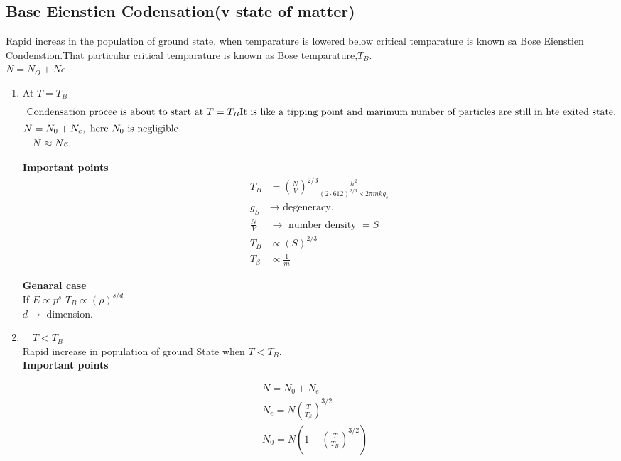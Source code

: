 \subsection{Base Eienstien Codensation(v state of matter)}
Rapid increas in the population of ground state,
when temparature is lowered below critical temparature is known sa Bose Eienstien Condenstion.That particular critical temparature is known as Bose temparature,$T_{B}.$\\
$N=N_{O}+Ne$\\
\begin{enumerate}
	\item At $T=T_{B}$\\
	\begin{align*}
	\intertext{	Condensation procee is about to start at $T=T_{B}$It is like a tipping point and marimum number of particles are still in hte exited state.}
   N&=N_{0}+N_{e},\text{ here $N_{0}$ is negligible}\\
	&N \approx N e.\\
	\end{align*}
	
	
	
\textbf{Important points}\\
	\begin{align*}
	T_{B}&=\left(\frac{N}{V}\right)^{2 / 3} \frac{h^{2}}{(2 \cdot 612)^{2 / 3} \times 2 \pi m k g_{s}}\\
	g_{S} &\rightarrow\text{ degeneracy.}\\
	\frac{N}{V} &\rightarrow\text{ number density $=S$}\\
	T_{B} &\propto(S)^{2 / 3}\\
	T_{\beta} &\propto \frac{1}{m}
	\end{align*}
	
	
	
\textbf{Genaral case}\\
	If $E \propto p^{s}$ $T_{B} \propto(\rho)^{s / d}$\\
	$d \rightarrow$ dimension.
	\item  $\quad T<T_{B}$\\
	Rapid increase in population of ground State when $T<T_{B}$.\\
\textbf{Important points}\\
\end{enumerate}
	\begin{align*}
	&N=N_{0}+N_{e} \\
	&N_{e}=N\left(\frac{T}{T_{\beta}}\right)^{3 / 2} \\
	&N_{0}=N\left(1-\left(\frac{T}{T_{B}}\right)^{3 / 2}\right)
	\end{align*}
